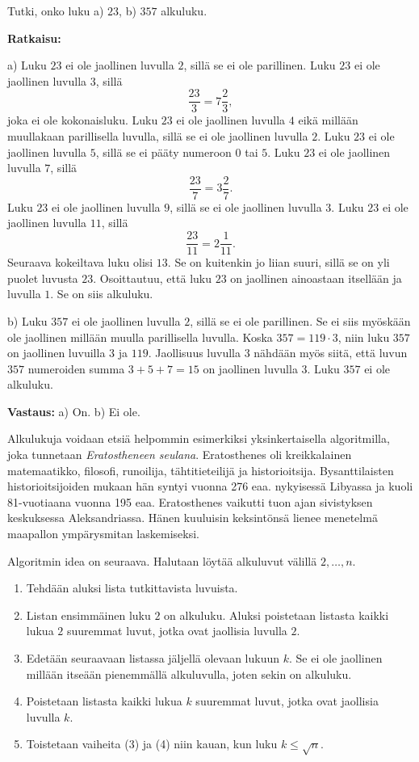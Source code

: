\begin{esimerkki}
Tutki, onko luku a) $23$, b) $357$ alkuluku.

{\bf Ratkaisu:}

a) Luku $23$ ei ole jaollinen luvulla $2$, sillä se ei ole
parillinen. Luku $23$ ei ole jaollinen luvulla $3$, sillä
\[
\frac{23}{3}= 7\frac{2}{3},
\]
joka ei ole kokonaisluku. Luku $23$ ei ole jaollinen luvulla $4$
eikä millään muullakaan parillisella luvulla, sillä se ei ole
jaollinen luvulla $2$. Luku $23$ ei ole
jaollinen luvulla $5$, sillä se ei pääty numeroon $0$ tai $5$.
Luku $23$ ei ole jaollinen luvulla $7$, sillä
\[
\frac{23}{7} = 3\frac{2}{7}.
\]
Luku $23$ ei ole jaollinen luvulla $9$, sillä se ei ole jaollinen
luvulla $3$. Luku $23$ ei ole jaollinen luvulla $11$, sillä
\[
\frac{23}{11} = 2\frac{1}{11}.
\]
Seuraava kokeiltava luku olisi $13$. Se on kuitenkin jo liian
suuri, sillä se on yli puolet luvusta $23$. Osoittautuu, että
luku $23$ on jaollinen ainoastaan itsellään ja luvulla $1$. Se on
siis alkuluku.

b) Luku $357$ ei ole jaollinen luvulla $2$, sillä se ei ole
parillinen. Se ei siis myöskään ole jaollinen millään muulla
parillisella luvulla. Koska $357 = 119 \cdot 3$, niin luku $357$
on jaollinen luvuilla $3$ ja $119$. Jaollisuus luvulla $3$
nähdään myös siitä, että luvun $357$ numeroiden summa $3 + 5 + 7
= 15$ on jaollinen luvulla $3$. Luku $357$ ei ole alkuluku.

{\bf Vastaus:} a) On. b) Ei ole.
\end{esimerkki}

Alkulukuja voidaan etsiä helpommin esimerkiksi yksinkertaisella algoritmilla, joka tunnetaan {\em Eratostheneen seulana}. Eratosthenes oli kreikkalainen matemaatikko, filosofi, runoilija, tähtitieteilijä ja historioitsija. Bysanttilaisten historioitsijoiden mukaan hän syntyi vuonna 276 eaa. nykyisessä Libyassa ja kuoli 81-vuotiaana vuonna 195 eaa. Eratosthenes vaikutti tuon ajan sivistyksen keskuksessa Aleksandriassa. Hänen kuuluisin keksintönsä lienee menetelmä maapallon ympärysmitan laskemiseksi. %

Algoritmin idea on seuraava. Halutaan löytää alkuluvut välillä $2,\ldots,n$.
\begin{enumerate}
\item Tehdään aluksi lista tutkittavista luvuista. 
\item Listan ensimmäinen luku $2$ on alkuluku. Aluksi poistetaan listasta kaikki lukua $2$ suuremmat luvut, jotka ovat jaollisia luvulla $2$.
\item Edetään seuraavaan listassa jäljellä olevaan lukuun $k$. Se ei ole jaollinen millään itseään pienemmällä alkuluvulla, joten sekin on alkuluku.
\item Poistetaan listasta kaikki lukua $k$ suuremmat luvut, jotka ovat jaollisia luvulla $k$.
\item Toistetaan vaiheita (3) ja (4) niin kauan, kun luku $k \le \sqrt{n}$. 
\end{enumerate}

